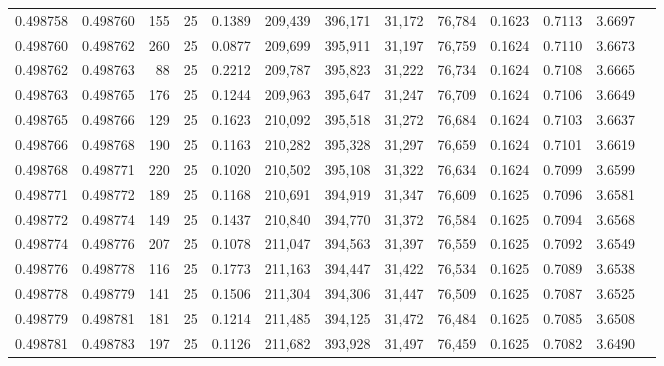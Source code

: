 \begin{tabular}{rrrrrrrrrrrrr}
0.498758 & 0.498760 & 155 &  25 &                                     0.1389 & 209,439 & 396,171 &  31,172 &  76,784 & 0.1623 & 0.7113 & 3.6697 \\
0.498760 & 0.498762 & 260 &  25 &                                     0.0877 & 209,699 & 395,911 &  31,197 &  76,759 & 0.1624 & 0.7110 & 3.6673 \\
0.498762 & 0.498763 &  88 &  25 &                                     0.2212 & 209,787 & 395,823 &  31,222 &  76,734 & 0.1624 & 0.7108 & 3.6665 \\
0.498763 & 0.498765 & 176 &  25 &                                     0.1244 & 209,963 & 395,647 &  31,247 &  76,709 & 0.1624 & 0.7106 & 3.6649 \\
0.498765 & 0.498766 & 129 &  25 &                                     0.1623 & 210,092 & 395,518 &  31,272 &  76,684 & 0.1624 & 0.7103 & 3.6637 \\
0.498766 & 0.498768 & 190 &  25 &                                     0.1163 & 210,282 & 395,328 &  31,297 &  76,659 & 0.1624 & 0.7101 & 3.6619 \\
0.498768 & 0.498771 & 220 &  25 &                                     0.1020 & 210,502 & 395,108 &  31,322 &  76,634 & 0.1624 & 0.7099 & 3.6599 \\
0.498771 & 0.498772 & 189 &  25 &                                     0.1168 & 210,691 & 394,919 &  31,347 &  76,609 & 0.1625 & 0.7096 & 3.6581 \\
0.498772 & 0.498774 & 149 &  25 &                                     0.1437 & 210,840 & 394,770 &  31,372 &  76,584 & 0.1625 & 0.7094 & 3.6568 \\
0.498774 & 0.498776 & 207 &  25 &                                     0.1078 & 211,047 & 394,563 &  31,397 &  76,559 & 0.1625 & 0.7092 & 3.6549 \\
0.498776 & 0.498778 & 116 &  25 &                                     0.1773 & 211,163 & 394,447 &  31,422 &  76,534 & 0.1625 & 0.7089 & 3.6538 \\
0.498778 & 0.498779 & 141 &  25 &                                     0.1506 & 211,304 & 394,306 &  31,447 &  76,509 & 0.1625 & 0.7087 & 3.6525 \\
0.498779 & 0.498781 & 181 &  25 &                                     0.1214 & 211,485 & 394,125 &  31,472 &  76,484 & 0.1625 & 0.7085 & 3.6508 \\
0.498781 & 0.498783 & 197 &  25 &                                     0.1126 & 211,682 & 393,928 &  31,497 &  76,459 & 0.1625 & 0.7082 & 3.6490 \\

\end{tabular}
